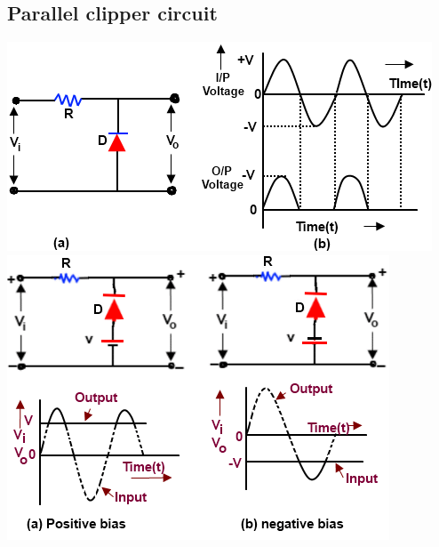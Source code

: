 \documentclass[10pt, a4paper]{report}
\begin{document}
	\subsection{Parallel clipper circuit}		\includegraphics[width=\linewidth]{img/shunt-parallel-nagative-clipper}
	\includegraphics[width=\linewidth]{img/bias-shunt-parallel-nagative-clipper}
	
\end{document}

